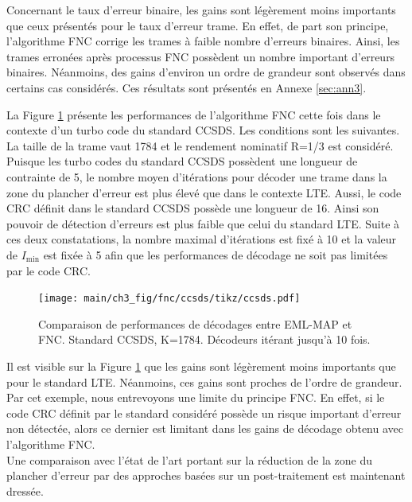 Concernant le taux d'erreur binaire, les gains sont légèrement moins importants que ceux présentés pour le taux d'erreur trame. En effet,
de part son principe, l'algorithme FNC corrige les trames à faible nombre d'erreurs binaires. Ainsi, les trames erronées 
après processus FNC possèdent un nombre important d'erreurs binaires. Néanmoins, des gains d'environ un ordre de grandeur 
sont observés dans certains cas considérés. Ces résultats sont présentés en Annexe \ref{sec:ann3}.

La Figure \ref{fig:fnc_ccsds} présente les performances de l'algorithme FNC cette fois dans le contexte d'un turbo code 
du standard CCSDS. Les conditions sont les suivantes. La taille de la trame vaut 1784 et le rendement nominatif R=1/3 est 
considéré. 
Puisque les turbo codes du standard CCSDS possèdent une longueur de contrainte de 5, le nombre moyen d'itérations pour 
décoder une trame dans la zone du plancher d'erreur est plus élevé que dans le contexte LTE. Aussi, le code CRC définit 
dans le standard CCSDS possède une longueur de 16. Ainsi son pouvoir de détection d'erreurs est plus faible que celui du 
standard LTE. Suite à ces deux constatations, la nombre maximal d'itérations est fixé à 10 et la valeur de $I_\text{min}$
est fixée à 5 afin que les performances de décodage ne soit pas limitées par le code CRC.

\begin{figure}[!hb]
	\centering
	\texttt{[image: main/ch3\_fig/fnc/ccsds/tikz/ccsds.pdf]}
	\caption{Comparaison de performances de décodages entre EML-MAP et FNC. Standard CCSDS, K=1784.
	Décodeurs itérant jusqu'à 10 fois. \label{fig:fnc_ccsds}}
\end{figure}

Il est visible sur la Figure \ref{fig:fnc_ccsds} que les gains sont légèrement moins importants que pour le standard LTE. 
Néanmoins, ces gains sont proches de l'ordre de grandeur.
Par cet exemple, nous entrevoyons une limite du principe FNC. En effet, si le code CRC définit par le standard considéré 
possède un risque important d'erreur non détectée, alors ce dernier est limitant dans les gains de décodage obtenu
avec l'algorithme FNC. \\
Une comparaison avec l'état de l'art portant sur la réduction de la zone du plancher d'erreur 
par des approches basées sur un post-traitement est maintenant dressée.


